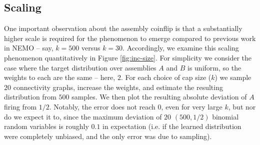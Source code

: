 \documentclass{article}
\theoremstyle{remark}
\newcommand{\1}{\mathbbm{1}}
\begin{document}

\subsection{Scaling} 
One important observation about the assembly coinflip is that a substantially higher scale is required for the phenomenon to emerge compared to previous work in NEMO \cite{dabagia2022assemblies, dabagia2024computation} -- say, $k=500$ versus $k=30$. Accordingly, we examine this scaling phenomenon quantitatively in Figure \ref{fig:inc-size}. For simplicity we consider the case where the target distribution over assemblies $A$ and $B$ is uniform, so the weights to each are the same -- here, $2$. For each choice of cap size ($k$) we sample $20$ connectivity graphs, increase the weights, and estimate the resulting distribution from $500$ samples. We then plot the resulting absolute deviation of $A$ firing from $1/2$. Notably, the error does not reach $0$, even for very large $k$, but nor do we expect it to, since the maximum deviation of $20$ $(500, 1/2)$ binomial random variables is roughly $0.1$ in expectation (i.e. if the learned distribution were completely unbiased, and the only error was due to sampling).
\end{document}
